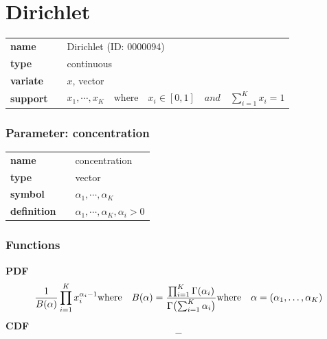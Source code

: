 \section*{Dirichlet} 

  \bigskip 

\begin{tabular}{p{2cm}cl}
\textbf{name} & & Dirichlet (ID: 0000094)\\ 
 
\textbf{type} & & continuous \\ 

\textbf{variate} & & $x$, vector \\ 

\textbf{support} & & $x_1, \cdots, x_K \quad\text{where}\quad x_i \in [0,1]\quad and \quad\sum_{i=1}^K x_i = 1$
\end{tabular}


\subsubsection*{Parameter: concentration}

\noindent\begin{tabular}{p{2cm}cl}
\textbf{name} & & concentration \\
\textbf{type} & & vector \\
\textbf{symbol} & & $\alpha_1, \cdots, \alpha_K$  \\
\textbf{definition} & & $\alpha_1, \cdots, \alpha_K, \alpha_i > 0$
\end{tabular}
\subsubsection*{Functions}

\smallskip \noindent \hspace{.2cm} \textbf{PDF} 
\begin{equation*}\frac{1}{B(\alpha)} \prod_{i=1}^K x_i^{\alpha_i - 1} \\ \text{where} \quad B(\alpha) = \frac{\prod_{i=1}^K \Gamma(\alpha_i)}{\Gamma\bigl(\sum_{i=1}^K \alpha_i\bigr)} \\ \text{where} \quad \alpha=(\alpha_1,\ldots,\alpha_K)\end{equation*}
\smallskip \noindent \hspace{.2cm} \textbf{CDF} 
\begin{equation*}-\end{equation*}
\smallskip
